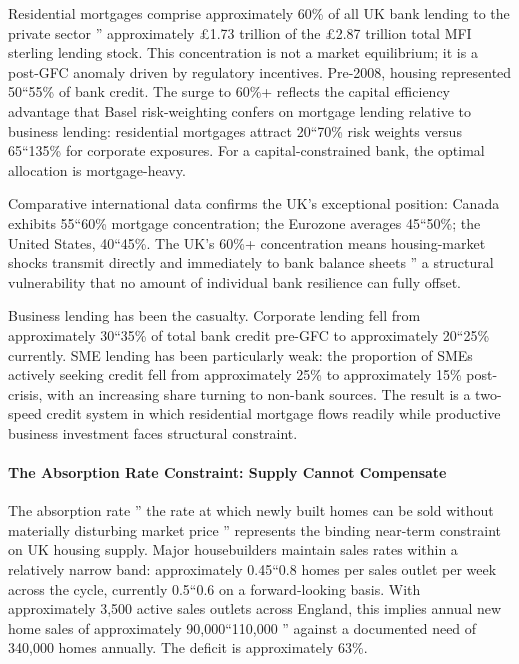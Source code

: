 \documentclass[
]{article}
\begin{document}
Residential mortgages comprise approximately 60\% of all UK bank lending
to the private sector '' approximately £1.73 trillion of the £2.87
trillion total MFI sterling lending stock. This concentration is not a
market equilibrium; it is a post-GFC anomaly driven by regulatory
incentives. Pre-2008, housing represented 50``55\% of bank credit. The
surge to 60\%+ reflects the capital efficiency advantage that Basel
risk-weighting confers on mortgage lending relative to business lending:
residential mortgages attract 20``70\% risk weights versus 65``135\% for
corporate exposures. For a capital-constrained bank, the optimal
allocation is mortgage-heavy.

Comparative international data confirms the UK's exceptional position:
Canada exhibits 55``60\% mortgage concentration; the Eurozone averages
45``50\%; the United States, 40``45\%. The UK's 60\%+ concentration
means housing-market shocks transmit directly and immediately to bank
balance sheets '' a structural vulnerability that no amount of
individual bank resilience can fully offset.

Business lending has been the casualty. Corporate lending fell from
approximately 30``35\% of total bank credit pre-GFC to approximately
20``25\% currently. SME lending has been particularly weak: the
proportion of SMEs actively seeking credit fell from approximately 25\%
to approximately 15\% post-crisis, with an increasing share turning to
non-bank sources. The result is a two-speed credit system in which
residential mortgage flows readily while productive business investment
faces structural constraint.

\paragraph{The Absorption Rate Constraint: Supply Cannot
Compensate}\label{the-absorption-rate-constraint-supply-cannot-compensate}

The absorption rate '' the rate at which newly built homes can be sold
without materially disturbing market price '' represents the binding
near-term constraint on UK housing supply. Major housebuilders maintain
sales rates within a relatively narrow band: approximately 0.45``0.8
homes per sales outlet per week across the cycle, currently 0.5``0.6 on
a forward-looking basis. With approximately 3,500 active sales outlets
across England, this implies annual new home sales of approximately
90,000``110,000 '' against a documented need of 340,000 homes annually.
The deficit is approximately 63\%.
\end{document}
